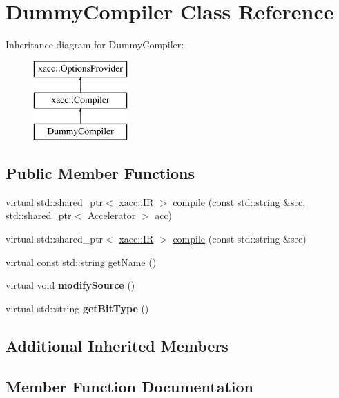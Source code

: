 \hypertarget{a02500}{}\section{Dummy\+Compiler Class Reference}
\label{a02500}
Inheritance diagram for Dummy\+Compiler\+:\begin{figure}[H]
\begin{center}
\leavevmode
\includegraphics[height=3.000000cm]{a02500}
\end{center}
\end{figure}
\subsection*{Public Member Functions}
\begin{DoxyCompactItemize}
\item 
virtual std\+::shared\+\_\+ptr$<$ \hyperlink{a02480}{xacc\+::\+IR} $>$ \hyperlink{a02500_acc75af818d62ba22d1dd7de3b66c4baf}{compile} (const std\+::string \&src, std\+::shared\+\_\+ptr$<$ \hyperlink{a02432}{Accelerator} $>$ acc)
\item 
virtual std\+::shared\+\_\+ptr$<$ \hyperlink{a02480}{xacc\+::\+IR} $>$ \hyperlink{a02500_a40d7cc3bbc72a2ce9362136b3b83245c}{compile} (const std\+::string \&src)
\item 
virtual const std\+::string \hyperlink{a02500_a76460cb78671dc2cf42f2bebf8fb80c7}{get\+Name} ()
\item 
\mbox{\label{a02500_a9f58a296f96aa340fc73b267f8c80fb0}} 
virtual void {\bfseries modify\+Source} ()
\item 
\mbox{\label{a02500_a1a9739b20fb26d1f440bdd6cdfab0d8a}} 
virtual std\+::string {\bfseries get\+Bit\+Type} ()
\end{DoxyCompactItemize}
\subsection*{Additional Inherited Members}


\subsection{Member Function Documentation}
\mbox{\label{a02500_acc75af818d62ba22d1dd7de3b66c4baf}} 

